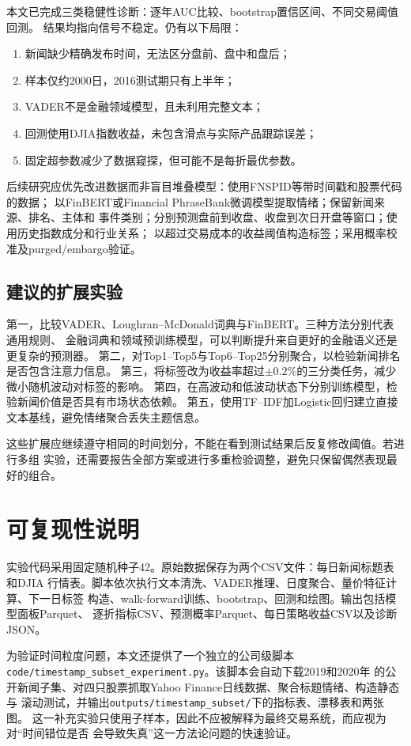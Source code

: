 \documentclass[UTF8,a4paper,10pt,twocolumn,fontset=none]{ctexart}
\begin{document}
本文已完成三类稳健性诊断：逐年AUC比较、bootstrap置信区间、不同交易阈值回测。
结果均指向信号不稳定。仍有以下局限：
\begin{enumerate}
  \item 新闻缺少精确发布时间，无法区分盘前、盘中和盘后；
  \item 样本仅约2000日，2016测试期只有上半年；
  \item VADER不是金融领域模型，且未利用完整文本；
  \item 回测使用DJIA指数收益，未包含滑点与实际产品跟踪误差；
  \item 固定超参数减少了数据窥探，但可能不是每折最优参数。
\end{enumerate}

后续研究应优先改进数据而非盲目堆叠模型：使用FNSPID等带时间戳和股票代码的数据；
以FinBERT或Financial PhraseBank微调模型提取情绪；保留新闻来源、排名、主体和
事件类别；分别预测盘前到收盘、收盘到次日开盘等窗口；使用历史指数成分和行业关系；
以超过交易成本的收益阈值构造标签；采用概率校准及purged/embargo验证。

\subsection{建议的扩展实验}

第一，比较VADER、Loughran--McDonald词典与FinBERT。三种方法分别代表通用规则、
金融词典和领域预训练模型，可以判断提升来自更好的金融语义还是更复杂的预测器。
第二，对Top1--Top5与Top6--Top25分别聚合，以检验新闻排名是否包含注意力信息。
第三，将标签改为收益率超过$\pm0.2\%$的三分类任务，减少微小随机波动对标签的影响。
第四，在高波动和低波动状态下分别训练模型，检验新闻价值是否具有市场状态依赖。
第五，使用TF--IDF加Logistic回归建立直接文本基线，避免情绪聚合丢失主题信息。

这些扩展应继续遵守相同的时间划分，不能在看到测试结果后反复修改阈值。若进行多组
实验，还需要报告全部方案或进行多重检验调整，避免只保留偶然表现最好的组合。

\section{可复现性说明}

实验代码采用固定随机种子42。原始数据保存为两个CSV文件：每日新闻标题表和DJIA
行情表。脚本依次执行文本清洗、VADER推理、日度聚合、量价特征计算、下一日标签
构造、walk-forward训练、bootstrap、回测和绘图。输出包括模型面板Parquet、
逐折指标CSV、预测概率Parquet、每日策略收益CSV以及诊断JSON。

为验证时间粒度问题，本文还提供了一个独立的公司级脚本
\texttt{code/timestamp\_subset\_experiment.py}。该脚本会自动下载2019和2020年
的公开新闻子集、对四只股票抓取Yahoo Finance日线数据、聚合标题情绪、构造静态与
滚动测试，并输出\texttt{outputs/timestamp\_subset/}下的指标表、漂移表和两张图。
这一补充实验只使用子样本，因此不应被解释为最终交易系统，而应视为对“时间错位是否
会导致失真”这一方法论问题的快速验证。
\end{document}
